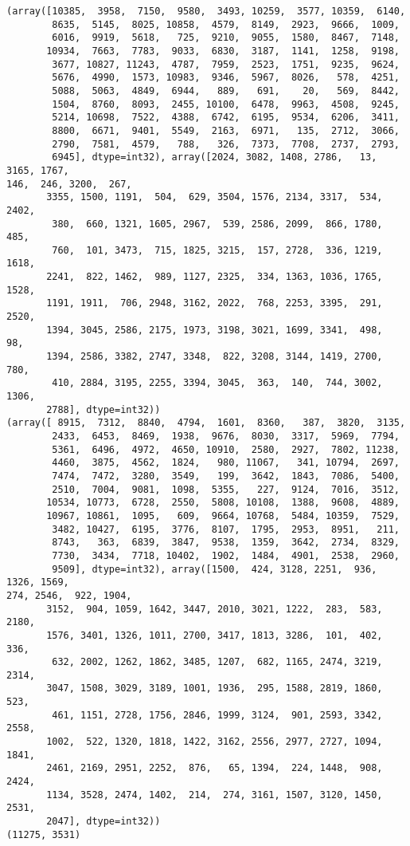 \documentclass[11pt]{article}
\begin{document}
    \begin{Verbatim}[commandchars=\\\{\}]
(array([10385,  3958,  7150,  9580,  3493, 10259,  3577, 10359,  6140,
        8635,  5145,  8025, 10858,  4579,  8149,  2923,  9666,  1009,
        6016,  9919,  5618,   725,  9210,  9055,  1580,  8467,  7148,
       10934,  7663,  7783,  9033,  6830,  3187,  1141,  1258,  9198,
        3677, 10827, 11243,  4787,  7959,  2523,  1751,  9235,  9624,
        5676,  4990,  1573, 10983,  9346,  5967,  8026,   578,  4251,
        5088,  5063,  4849,  6944,   889,   691,    20,   569,  8442,
        1504,  8760,  8093,  2455, 10100,  6478,  9963,  4508,  9245,
        5214, 10698,  7522,  4388,  6742,  6195,  9534,  6206,  3411,
        8800,  6671,  9401,  5549,  2163,  6971,   135,  2712,  3066,
        2790,  7581,  4579,   788,   326,  7373,  7708,  2737,  2793,
        6945], dtype=int32), array([2024, 3082, 1408, 2786,   13, 3165, 1767,
146,  246, 3200,  267,
       3355, 1500, 1191,  504,  629, 3504, 1576, 2134, 3317,  534, 2402,
        380,  660, 1321, 1605, 2967,  539, 2586, 2099,  866, 1780,  485,
        760,  101, 3473,  715, 1825, 3215,  157, 2728,  336, 1219, 1618,
       2241,  822, 1462,  989, 1127, 2325,  334, 1363, 1036, 1765, 1528,
       1191, 1911,  706, 2948, 3162, 2022,  768, 2253, 3395,  291, 2520,
       1394, 3045, 2586, 2175, 1973, 3198, 3021, 1699, 3341,  498,   98,
       1394, 2586, 3382, 2747, 3348,  822, 3208, 3144, 1419, 2700,  780,
        410, 2884, 3195, 2255, 3394, 3045,  363,  140,  744, 3002, 1306,
       2788], dtype=int32))
(array([ 8915,  7312,  8840,  4794,  1601,  8360,   387,  3820,  3135,
        2433,  6453,  8469,  1938,  9676,  8030,  3317,  5969,  7794,
        5361,  6496,  4972,  4650, 10910,  2580,  2927,  7802, 11238,
        4460,  3875,  4562,  1824,   980, 11067,   341, 10794,  2697,
        7474,  7472,  3280,  3549,   199,  3642,  1843,  7086,  5400,
        2510,  7004,  9081,  1098,  5355,   227,  9124,  7016,  3512,
       10534, 10773,  6728,  2550,  5808, 10108,  1388,  9608,  4889,
       10967, 10861,  1095,   609,  9664, 10768,  5484, 10359,  7529,
        3482, 10427,  6195,  3776,  8107,  1795,  2953,  8951,   211,
        8743,   363,  6839,  3847,  9538,  1359,  3642,  2734,  8329,
        7730,  3434,  7718, 10402,  1902,  1484,  4901,  2538,  2960,
        9509], dtype=int32), array([1500,  424, 3128, 2251,  936, 1326, 1569,
274, 2546,  922, 1904,
       3152,  904, 1059, 1642, 3447, 2010, 3021, 1222,  283,  583, 2180,
       1576, 3401, 1326, 1011, 2700, 3417, 1813, 3286,  101,  402,  336,
        632, 2002, 1262, 1862, 3485, 1207,  682, 1165, 2474, 3219, 2314,
       3047, 1508, 3029, 3189, 1001, 1936,  295, 1588, 2819, 1860,  523,
        461, 1151, 2728, 1756, 2846, 1999, 3124,  901, 2593, 3342, 2558,
       1002,  522, 1320, 1818, 1422, 3162, 2556, 2977, 2727, 1094, 1841,
       2461, 2169, 2951, 2252,  876,   65, 1394,  224, 1448,  908, 2424,
       1134, 3528, 2474, 1402,  214,  274, 3161, 1507, 3120, 1450, 2531,
       2047], dtype=int32))
(11275, 3531)
    \end{Verbatim}
\end{document}
